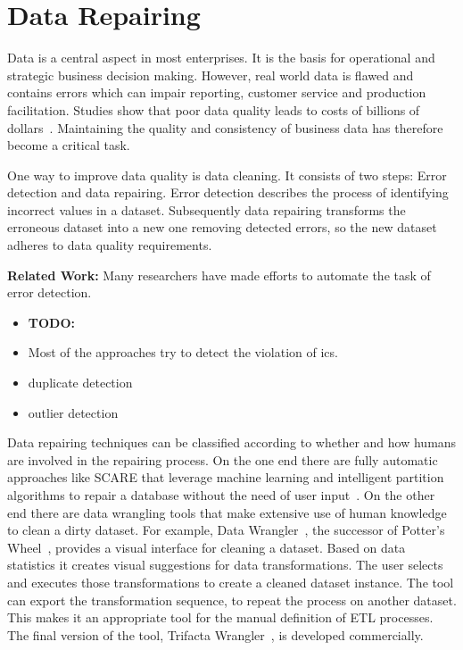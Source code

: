 
\section{Data Repairing}\label{sec:introduction}
  Data is a central aspect in most enterprises.
  It is the basis for operational and strategic business decision making.
  However, real world data is flawed and contains errors which can impair reporting, customer service and production facilitation.
  Studies show that poor data quality leads to costs of billions of dollars~\cite{Redman:quality_disaster, cost_of_low_qual}.
  Maintaining the quality and consistency of business data has therefore become a critical task.

  One way to improve data quality is data cleaning.
  It consists of two steps: Error detection and data repairing.
  Error detection describes the process of identifying incorrect values in a dataset.
  Subsequently data repairing transforms the erroneous dataset into a new one removing detected errors, so the new dataset adheres to data quality requirements.

  \bigskip
  \textbf{Related Work:}
  Many researchers have made efforts to automate the task of error detection.
  \begin{itemize}
    \item \textbf{TODO:}
    \item Most of the approaches try to detect the violation of \glspl{ic}.
    \item duplicate detection
    \item outlier detection
  \end{itemize}

  Data repairing techniques can be classified according to whether and how humans are involved in the repairing process.
  On the one end there are fully automatic approaches like SCARE that leverage machine learning and intelligent partition algorithms to repair a database without the need of user input~\cite{scare}.
  On the other end there are data wrangling tools that make extensive use of human knowledge to clean a dirty dataset.
  For example, Data Wrangler~\cite{data_wrangler}, the successor of Potter's Wheel~\cite{potters_wheel}, provides a visual interface for cleaning a dataset.
  Based on data statistics it creates visual suggestions for data transformations.
  The user selects and executes those transformations to create a cleaned dataset instance.
  The tool can export the transformation sequence, to repeat the process on another dataset.
  This makes it an appropriate tool for the manual definition of ETL processes.
  The final version of the tool, Trifacta Wrangler~\cite{trifacta_wrangler}, is developed commercially.

